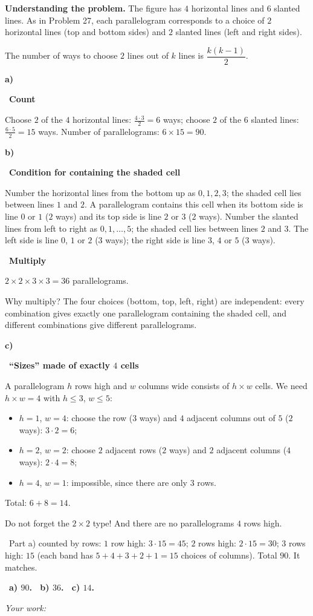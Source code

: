 \documentclass[11pt]{article}
\newif\ifsol \solfalse
\providecommand{\AnsWord}{Đáp số}
\newcommand{\StuProb}[2]{\begin{probboxS}{#1}{#2}\StuProbBody\end{probboxS}}
\newcommand{\ans}[1]{\par\smallskip{\bfseries\color{tmGreen!88!black}\AnsWord:}\ {\bfseries\color{AnsRed}#1}\par}
\newcommand{\probsol}[1]{%
  \begin{lrbox}{\solmeasure}\begin{minipage}{\dimexpr\linewidth-24pt\relax}#1\end{minipage}\end{lrbox}%
  \ifsol
    \begin{solbox}#1\end{solbox}%
  \else
    \setlength{\solht}{\dimexpr\ht\solmeasure+\dp\solmeasure+0.85cm\relax}%
    \ifdim\solht<1.35cm\setlength{\solht}{1.35cm}\fi
    \ifdim\solht>\StudentMaxWork\setlength{\solht}{\StudentMaxWork}\fi
    \par\noindent\begin{minipage}{\linewidth}%
    \expandafter\StuProb\StuProbArgs
    \begin{tcolorbox}[colback=white,colframe=Line,boxrule=0.8pt,arc=5pt,
      left=8pt,right=8pt,top=4pt,bottom=4pt,height=\solht]{\footnotesize\color{Slate}\itshape\WorkWord}\end{tcolorbox}%
    \end{minipage}\par\medskip
  \fi}
\newlength{\StudentMaxWork}\setlength{\StudentMaxWork}{4.5cm}
\newcommand{\step}[2]{\par\smallskip\noindent{\bfseries\color{tmBlue!85!black}\StepWord~#1.}\ {\bfseries #2}\par\nopagebreak}
\newcommand{\verify}[1]{\par\smallskip\noindent{\bfseries\color{tmGreen!80!black}\faCheckCircle\ \CheckWord}\ #1\par}
\def\WorkWord{Your work:}
\def\AnsWord{Answer}
\def\StepWord{Step}
\def\CheckWord{Check:}
\begin{document}
\probsol{
\textbf{Understanding the problem.} The figure has $4$ horizontal lines and $6$ slanted lines. As in Problem 27,
each parallelogram corresponds to a choice of $2$ horizontal lines (top and bottom sides) and $2$ slanted lines
(left and right sides).
\begin{recallbox}The number of ways to choose $2$ lines out of $k$ lines is $\dfrac{k(k-1)}{2}$.\end{recallbox}

\textbf{a)}
\step{1}{Count}
Choose $2$ of the $4$ horizontal lines: $\tfrac{4\cdot 3}{2}=6$ ways; choose $2$ of the $6$ slanted lines:
$\tfrac{6\cdot5}{2}=15$ ways. Number of parallelograms: $6\times 15=90$.

\textbf{b)}
\step{2}{Condition for containing the shaded cell}
Number the horizontal lines from the bottom up as $0,1,2,3$; the shaded cell lies between lines $1$ and $2$. A
parallelogram contains this cell when its bottom side is line $0$ or $1$ ($2$ ways) and its top side is line $2$ or
$3$ ($2$ ways). Number the slanted lines from left to right as $0,1,\dots,5$; the shaded cell lies between lines $2$
and $3$. The left side is line $0$, $1$ or $2$ ($3$ ways); the right side is line $3$, $4$ or $5$ ($3$ ways).
\step{3}{Multiply}
$2\times 2\times 3\times 3=36$ parallelograms.
\begin{proofbox}Why multiply? The four choices (bottom, top, left, right) are independent: every combination gives
exactly one parallelogram containing the shaded cell, and different combinations give different
parallelograms.\end{proofbox}

\textbf{c)}
\step{4}{``Sizes'' made of exactly $4$ cells}
A parallelogram $h$ rows high and $w$ columns wide consists of $h\times w$ cells. We need $h\times w=4$ with
$h\le 3$, $w\le 5$:
\begin{itemize}[leftmargin=1.4em,itemsep=1pt]
\item $h=1$, $w=4$: choose the row ($3$ ways) and $4$ adjacent columns out of $5$ ($2$ ways): $3\cdot 2=6$;
\item $h=2$, $w=2$: choose $2$ adjacent rows ($2$ ways) and $2$ adjacent columns ($4$ ways): $2\cdot 4=8$;
\item $h=4$, $w=1$: impossible, since there are only $3$ rows.
\end{itemize}
Total: $6+8=14$.
\begin{warnbox}Do not forget the $2\times 2$ type! And there are no parallelograms $4$ rows high.\end{warnbox}
\verify{Part a) counted by rows: $1$ row high: $3\cdot 15=45$; $2$ rows high: $2\cdot 15=30$; $3$ rows high: $15$
(each band has $5+4+3+2+1=15$ choices of columns). Total $90$. It matches.}
\ans{a) $90$. \ b) $36$. \ c) $14$.}
}
\end{document}
